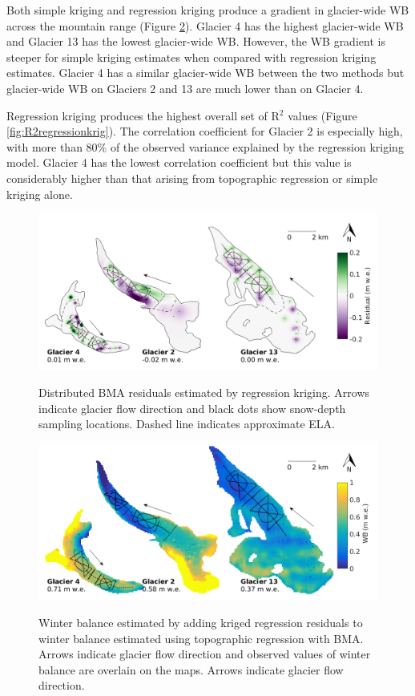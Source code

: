 \documentclass{sfuthesis}
\newcommand{\topomap}{Arrows indicate glacier flow direction and black dots show snow-depth sampling locations. }
\newcommand{\swedots}{Arrows indicate glacier flow direction and observed values of winter balance are overlain on the maps. }
\begin{document}
{Both simple kriging and regression kriging produce a gradient in glacier-wide WB across the mountain range (Figure \ref{fig:Regression-Kriging}). Glacier 4 has the highest glacier-wide WB and Glacier 13 has the lowest glacier-wide WB. However, the WB gradient is steeper for simple kriging estimates when compared with regression kriging estimates. Glacier 4 has a similar glacier-wide WB between the two methods but glacier-wide WB on Glaciers 2 and 13 are much lower than on Glacier 4.  

Regression kriging produces the highest overall set of R$^2$ values (Figure \ref{fig:R2regressionkrig}). The correlation coefficient for Glacier 2 is especially high, with more than 80\% of the observed variance explained by the regression kriging model. Glacier 4 has the lowest correlation coefficient but this value is considerably higher than that arising from topographic regression or simple kriging alone. 

\begin{figure}[H]
	\centering
	\includegraphics[width = \textwidth]{residualsKriged.png}\\
	\caption[Distributed BMA residuals estimated by regression kriging]{Distributed BMA residuals estimated by regression kriging. \topomap Dashed line indicates approximate ELA.}
	\label{fig:residualsKRIGING}
\end{figure}

\begin{figure}[H]
	\centering
	\includegraphics[width = \textwidth]{RegressionKriging.png}\\
	\caption[Winter balance estimated by adding kriged regression residuals to winter balance estimated using topographic regression with BMA]{Winter balance estimated by adding kriged regression residuals to winter balance estimated using topographic regression with BMA. \swedots Arrows indicate glacier flow direction.}
	\label{fig:Regression-Kriging}
\end{figure}

}
\end{document}
